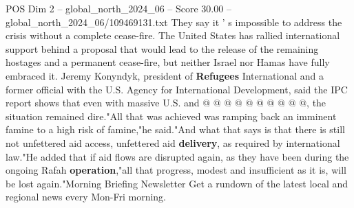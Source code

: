 \begin{textsample}{POS Dim 2 – global\_north\_2024\_06 – Score 30.00 – global\_north\_2024\_06/109469131.txt}
They say it ' s impossible to address the crisis without a complete cease-fire.
The United States has rallied international support behind a proposal that would lead to the release of the remaining hostages and a permanent cease-fire, but neither Israel nor Hamas have fully embraced it.
Jeremy Konyndyk, president of \textbf{Refugees} International and a former official with the U.S.
Agency for International Development, said the IPC report shows that even with massive U.S. and @ @ @ @ @ @ @ @ @ @, the situation remained dire."All that was achieved was ramping back an imminent famine to a high risk of famine,"he said."And what that says is that there is still not unfettered aid access, unfettered aid \textbf{delivery}, as required by international law."He added that if aid flows are disrupted again, as they have been during the ongoing Rafah \textbf{operation},"all that progress, modest and insufficient as it is, will be lost again."Morning Briefing Newsletter Get a rundown of the latest local and regional news every Mon-Fri morning.

\end{textsample}
